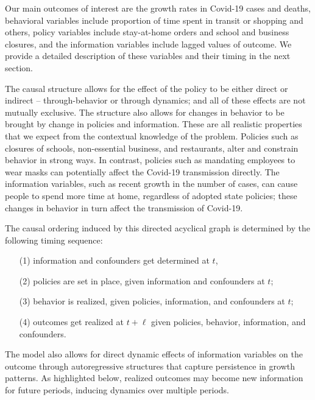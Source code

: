 \documentclass[11pt,reqno,letter]{amsart}
\theoremstyle{definition}
\begin{document}
Our main outcomes of interest are the growth rates in Covid-19 cases and deaths,  behavioral variables include proportion of time spent in transit or shopping and others, policy variables include stay-at-home orders and school and business closures, and the information variables include lagged values of outcome. We provide a detailed description of these variables and their timing in the next section.


The causal structure  allows for  the effect of the policy to be either direct or indirect -- through-behavior or through dynamics; and all of these effects are not mutually exclusive. The structure also allows for changes in behavior to be brought by change in policies and information. These are all realistic properties that we expect from the contextual knowledge of the problem. Policies such as closures of schools, non-essential business, and restaurants, alter and constrain behavior in strong ways.  In contrast, policies such as mandating employees to wear masks can potentially affect the Covid-19 transmission directly.  The information variables, such as recent growth in the number of cases, can cause people to spend more time at home, regardless of adopted state policies; these changes in
behavior in turn affect the transmission of Covid-19.

The causal ordering induced by this directed acyclical graph is determined by the following
timing sequence: %
\begin{itemize}
\item[(1)]  information and confounders get determined at $t$,
\item[(2)] policies are set in place, given information and confounders at $t$;
\item[(3)] behavior is realized, given policies, information, and confounders at $t$;
\item[(4)] outcomes get realized at $t+\ell$ given policies, behavior, information, and confounders.
\end{itemize}

The model also allows for direct dynamic effects of information variables on the outcome through autoregressive structures that capture persistence in growth patterns. As  highlighted below, realized outcomes may become new information for future periods, inducing dynamics over multiple periods.
\end{document}
